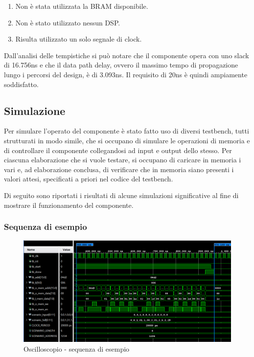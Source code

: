 \documentclass{article}
\begin{document}
\begin{enumerate}
    \item Non è stata utilizzata la BRAM disponibile.
    \item Non è stato utilizzato nessun DSP.
    \item Risulta utilizzato un solo segnale di clock.
\end{enumerate}

Dall'analisi delle tempistiche si può notare che il componente opera con uno slack di 16.756ns e che il data path delay, ovvero il massimo tempo di propagazione lungo i percorsi del design, è di 3.093ns. Il requisito di 20ns è quindi ampiamente soddisfatto.

\subsection{Simulazione}

Per simulare l'operato del componente è stato fatto uso di diversi testbench, tutti strutturati in modo simile, che si occupano di simulare le operazioni di memoria e di controllare il componente collegandosi ad input e output dello stesso. Per ciascuna elaborazione che si vuole testare, si occupano di caricare in memoria i vari  e, ad elaborazione conclusa, di verificare che in memoria siano presenti i valori attesi, specificati a priori nel codice del testbench.

Di seguito sono riportati i risultati di alcune simulazioni significative al fine di mostrare il funzionamento del componente.

\subsubsection{Sequenza di esempio}

\begin{figure}[b]
    \centering
    \includegraphics[width=1\linewidth]{tb/custom_tb.png}
    \caption{Oscilloscopio - sequenza di esempio}
    \label{fig:suctom-tb}
\end{figure}
\end{document}
